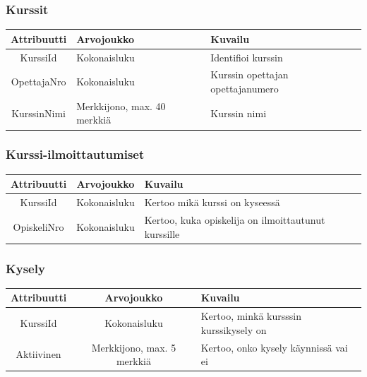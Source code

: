 \documentclass[12pt,twoside,a4paper,leqno,titlepage]{article}
\begin{document}
\subsubsection*{Kurssit}

\begin{tabular}{|c|p{5cm}|p{5cm}|}
  \hline
  \textbf{Attribuutti} & \textbf{Arvojoukko} & \textbf{Kuvailu} \\
  \hline
  KurssiId & Kokonaisluku & Identifioi kurssin \\
  \hline
  OpettajaNro & Kokonaisluku & Kurssin opettajan opettajanumero \\
  \hline
  KurssinNimi & Merkkijono, max. 40 merkkiä & Kurssin nimi \\
  \hline
\end{tabular}

\subsubsection*{Kurssi-ilmoittautumiset}

\begin{tabular}{|c|c|p{5cm}|}
  \hline
  \textbf{Attribuutti} & \textbf{Arvojoukko} & \textbf{Kuvailu} \\
  \hline
  KurssiId & Kokonaisluku & Kertoo mikä kurssi on kyseessä \\
  \hline
  OpiskeliNro & Kokonaisluku & Kertoo, kuka opiskelija on ilmoittautunut
  kurssille \\
  \hline
\end{tabular}

\subsubsection*{Kysely}

\begin{table}[!h]
\begin{tabular}{|c|c|p{5cm}|}
  \hline
  \textbf{Attribuutti} & \textbf{Arvojoukko} & \textbf{Kuvailu} \\
  \hline
  KurssiId & Kokonaisluku & Kertoo, minkä kursssin kurssikysely on \\
  \hline
  Aktiivinen & Merkkijono, max. 5 merkkiä & Kertoo, onko kysely käynnissä vai ei \\
  \hline
\end{tabular}
\end{table}
\end{document}

